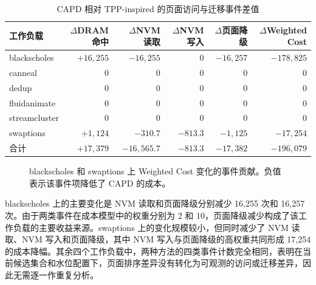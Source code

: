 \begin{table}[htbp]
  \centering
  \scriptsize
  \caption{CAPD 相对 TPP-inspired 的页面访问与迁移事件差值}
  \label{tab:capd-workload-event-delta}
  \renewcommand{\arraystretch}{1.15}
  \setlength{\tabcolsep}{4pt}
  \begin{tabular}{lrrrrr}
    \toprule
    工作负载 & $\Delta$DRAM 命中 & $\Delta$NVM 读取 & $\Delta$NVM 写入 & $\Delta$页面降级 & $\Delta$Weighted Cost \\
    \midrule
    blackscholes  & $+16,255$ & $-16,255$ & $0$      & $-16,257$ & $-178,825$ \\
    canneal       & $0$       & $0$       & $0$      & $0$       & $0$ \\
    dedup         & $0$       & $0$       & $0$      & $0$       & $0$ \\
    fluidanimate  & $0$       & $0$       & $0$      & $0$       & $0$ \\
    streamcluster & $0$       & $0$       & $0$      & $0$       & $0$ \\
    swaptions     & $+1,124$  & $-310.7$  & $-813.3$ & $-1,125$ & $-17,254$ \\
    \midrule
    合计           & $+17,379$ & $-16,565.7$ & $-813.3$ & $-17,382$ & $-196,079$ \\
    \bottomrule
  \end{tabular}
\end{table}

\begin{figure}[htbp]
  \centering
  \caption{blackscholes 和 swaptions 上 Weighted Cost 变化的事件贡献。负值表示该事件项降低了 CAPD 的成本。}
  \label{fig:capd-event-contribution}
\end{figure}

blackscholes 上的主要变化是 NVM 读取和页面降级分别减少 16,255 次和 16,257 次。由于两类事件在成本模型中的权重分别为 2 和 10，页面降级减少构成了该工作负载的主要收益来源。swaptions 上的变化规模较小，但同时减少了 NVM 读取、NVM 写入和页面降级，其中 NVM 写入与页面降级的高权重共同形成 17,254 的成本降幅。其余四个工作负载中，两种方法的四类事件计数完全相同，表明在当前候选集合和水位配置下，页面排序差异没有转化为可观测的访问或迁移差异，因此无需逐一作重复分析。

